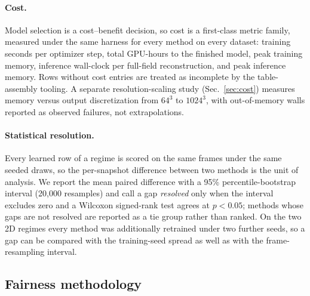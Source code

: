 \documentclass[aip,pof,reprint,amsmath,amssymb,superscriptaddress]{revtex4-1}
\begin{document}
\paragraph{Cost.} Model selection is a cost--benefit decision, so cost is a
first-class metric family, measured under the same harness for every method
on every dataset: training seconds per optimizer step, total GPU-hours to the
finished model, peak training memory, inference wall-clock per full-field
reconstruction, and peak inference memory. Rows without cost entries are
treated as incomplete by the table-assembly tooling. A separate
resolution-scaling study (Sec.~\ref{sec:cost}) measures memory versus output
discretization from $64^3$ to $1024^3$, with out-of-memory walls reported as
observed failures, not extrapolations.

\paragraph{Statistical resolution.} Every learned row of a regime is scored on
the same frames under the same seeded draws, so the per-snapshot difference
between two methods is the unit of analysis. We report the mean paired
difference with a 95\% percentile-bootstrap interval (20{,}000 resamples) and
call a gap \emph{resolved} only when the interval excludes zero and a Wilcoxon
signed-rank test agrees at $p<0.05$; methods whose gaps are not resolved are
reported as a tie group rather than ranked. On the two 2D regimes every method
was additionally retrained under two further seeds, so a gap can be compared
with the training-seed spread as well as with the frame-resampling interval.

\subsection{Fairness methodology}\label{sec:fairness}
\end{document}
